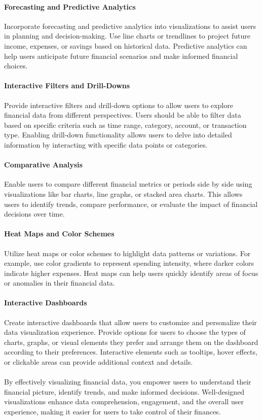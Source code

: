 \paragraph{Forecasting and Predictive Analytics}
Incorporate forecasting and predictive analytics into visualizations to assist users in planning and decision-making.
Use line charts or trendlines to project future income, expenses, or savings based on historical data. Predictive 
analytics can help users anticipate future financial scenarios and make informed financial choices.

\paragraph{Interactive Filters and Drill-Downs}
Provide interactive filters and drill-down options to allow users to explore financial data from different 
perspectives. Users should be able to filter data based on specific criteria such as time range, category, 
account, or transaction type. Enabling drill-down functionality allows users to delve into detailed information 
by interacting with specific data points or categories.

\paragraph{Comparative Analysis}
Enable users to compare different financial metrics or periods side by side using visualizations like bar charts, 
line graphs, or stacked area charts. This allows users to identify trends, compare performance, or evaluate the 
impact of financial decisions over time.

\paragraph{Heat Maps and Color Schemes}
Utilize heat maps or color schemes to highlight data patterns or variations. For example, use color gradients to 
represent spending intensity, where darker colors indicate higher expenses. Heat maps can help users quickly identify 
areas of focus or anomalies in their financial data.

\paragraph{Interactive Dashboards}
Create interactive dashboards that allow users to customize and personalize their data visualization experience. 
Provide options for users to choose the types of charts, graphs, or visual elements they prefer and arrange them 
on the dashboard according to their preferences. Interactive elements such as tooltips, hover effects, or clickable 
areas can provide additional context and details.
\\
\\
By effectively visualizing financial data, you empower users to understand their financial picture, identify trends, 
and make informed decisions. Well-designed visualizations enhance data comprehension, engagement, and the overall 
user experience, making it easier for users to take control of their finances.


